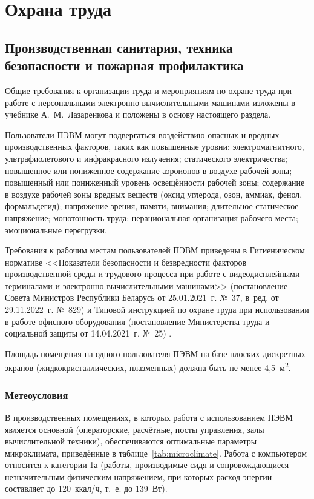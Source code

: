 \providecommand{\rv}[1]{\text{#1}}

\section{Охрана труда}

\subsection{Производственная санитария, техника безопасности и пожарная профилактика}

Общие требования к организации труда и мероприятиям по охране труда при работе с персональными электронно-вычислительными машинами изложены в учебнике А.~М.~Лазаренкова  и положены в основу настоящего раздела.

Пользователи ПЭВМ могут подвергаться воздействию опасных и вредных производственных факторов, таких как повышенные уровни: электромагнитного, ультрафиолетового и инфракрасного излучения; статического электричества; повышенное или пониженное содержание аэроионов в воздухе рабочей зоны; повышенный или пониженный уровень освещённости рабочей зоны; содержание в воздухе рабочей зоны вредных веществ (оксид углерода, озон, аммиак, фенол, формальдегид); напряжение зрения, памяти, внимания; длительное статическое напряжение; монотонность труда; нерациональная организация рабочего места; эмоциональные перегрузки.

Требования к рабочим местам пользователей ПЭВМ приведены в Гигиеническом нормативе <<Показатели безопасности и безвредности факторов производственной среды и трудового процесса при работе с видеодисплейными терминалами и электронно-вычислительными машинами>> (постановление Совета Министров Республики Беларусь от 25.01.2021~г. №~37, в~ред. от 29.11.2022~г. №~829)  и Типовой инструкцией по охране труда при использовании в работе офисного оборудования (постановление Министерства труда и социальной защиты от 14.04.2021~г. №~25) .

Площадь помещения на одного пользователя ПЭВМ на базе плоских дискретных экранов (жидкокристаллических, плазменных) должна быть не менее 4{,}5~м\textsuperscript{2}.

\subsubsection{Метеоусловия}

В производственных помещениях, в которых работа с использованием ПЭВМ является основной (операторские, расчётные, посты управления, залы вычислительной техники), обеспечиваются оптимальные параметры микроклимата, приведённые в таблице~\ref{tab:microclimate}.
Работа с компьютером относится к категории 1а (работы, производимые сидя и сопровождающиеся незначительным физическим напряжением, при которых расход энергии составляет до 120~ккал/ч, т.~е. до 139~Вт).

